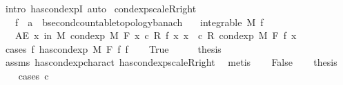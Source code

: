 \begin{isabellebody}
\ {\isacharparenleft}{\kern0pt}intro\ has{\isacharunderscore}{\kern0pt}cond{\isacharunderscore}{\kern0pt}expI{\isacharprime}{\kern0pt}{\isacharcomma}{\kern0pt}\ auto{\isacharparenright}{\kern0pt}%
\endisatagproof
{\isafoldproof}%
%
\isadelimproof
\isanewline
%
\endisadelimproof
\isanewline
{}\isamarkupfalse%
\ cond{\isacharunderscore}{\kern0pt}exp{\isacharunderscore}{\kern0pt}scaleR{\isacharunderscore}{\kern0pt}right{\isacharcolon}{\kern0pt}\isanewline
\ \ \ f\ {\isacharcolon}{\kern0pt}{\isacharcolon}{\kern0pt}\ {\isachardoublequoteopen}{\isacharprime}{\kern0pt}a\ {\isasymRightarrow}\ {\isacharprime}{\kern0pt}b{\isacharcolon}{\kern0pt}{\isacharcolon}{\kern0pt}{\isacharbraceleft}{\kern0pt}second{\isacharunderscore}{\kern0pt}countable{\isacharunderscore}{\kern0pt}topology{\isacharcomma}{\kern0pt}banach{\isacharbraceright}{\kern0pt}{\isachardoublequoteclose}\isanewline
\ \ \ {\isachardoublequoteopen}integrable\ M\ f{\isachardoublequoteclose}\isanewline
\ \ \ {\isachardoublequoteopen}AE\ x\ in\ M{\isachardot}{\kern0pt}\ cond{\isacharunderscore}{\kern0pt}exp\ M\ F\ {\isacharparenleft}{\kern0pt}{\isasymlambda}x{\isachardot}{\kern0pt}\ c\ {\isacharasterisk}{\kern0pt}\isactrlsub R\ f\ x{\isacharparenright}{\kern0pt}\ x\ {\isacharequal}{\kern0pt}\ c\ {\isacharasterisk}{\kern0pt}\isactrlsub R\ cond{\isacharunderscore}{\kern0pt}exp\ M\ F\ f\ x{\isachardoublequoteclose}\isanewline
%
\isadelimproof
%
\endisadelimproof
%
\isatagproof
{}\isamarkupfalse%
\ {\isacharparenleft}{\kern0pt}cases\ {\isachardoublequoteopen}{\isasymexists}f{\isacharprime}{\kern0pt}{\isachardot}{\kern0pt}\ has{\isacharunderscore}{\kern0pt}cond{\isacharunderscore}{\kern0pt}exp\ M\ F\ f\ f{\isacharprime}{\kern0pt}{\isachardoublequoteclose}{\isacharparenright}{\kern0pt}\isanewline
\ \ \isamarkupfalse%
\ True\isanewline
\ \ \isamarkupfalse%
\ \isamarkupfalse%
\ {\isacharquery}{\kern0pt}thesis\ \isamarkupfalse%
\ assms\ has{\isacharunderscore}{\kern0pt}cond{\isacharunderscore}{\kern0pt}exp{\isacharunderscore}{\kern0pt}charact\ has{\isacharunderscore}{\kern0pt}cond{\isacharunderscore}{\kern0pt}exp{\isacharunderscore}{\kern0pt}scaleR{\isacharunderscore}{\kern0pt}right\ \isamarkupfalse%
\ metis\isanewline
{}\isamarkupfalse%
\isanewline
\ \ \isamarkupfalse%
\ False\isanewline
\ \ \isamarkupfalse%
\ {\isacharquery}{\kern0pt}thesis\isanewline
\ \ \isamarkupfalse%
\ {\isacharparenleft}{\kern0pt}cases\ {\isachardoublequoteopen}c\ {\isacharequal}{\kern0pt}\ {}{\isachardoublequoteclose}{\isacharparenright}{\kern0pt}\isanewline

\end{isabellebody}
